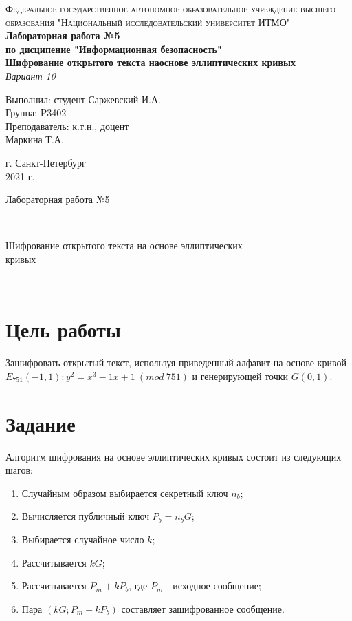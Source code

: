 \documentclass[12pt, a4paper]{article}
\begin{document}
\begin{titlepage}
\begin{center}

\textsc{Федеральное государственное автономное образовательное учреждение высшего\\
образования "Национальный исследовательский университет ИТМО"}
\vfill
\textbf{Лабораторная работа №5\\[4mm]
по дисципение "Информационная безопасность"\\[4mm]
Шифрование открытого текста наоснове эллиптических кривых\\[4mm]
}
\textit{Вариант 10\\[20mm]}
\begin{flushright}
Выполнил: студент Саржевский И.А.
\\[2mm]Группа: P3402\\[4mm]
Преподаватель: к.т.н., доцент\\
Маркина Т.А.
\end{flushright}
\vfill
г. Санкт-Петербург\\[2mm]
2021 г.

\end{center}
\end{titlepage}

\begin{huge}Лабораторная работа №5\end{huge}\\[4mm]
\begin{Large}Шифрование открытого текста на основе эллиптических\\кривых\end{Large}\\

\section*{Цель работы}

Зашифровать открытый текст, используя приведенный алфавит на основе кривой
$E_{751}(-1,1): y^2=x^3-1x+1\:(mod\:751)$ и генерирующей точки $G (0,1)$.

\section*{Задание}

Алгоритм шифрования на основе эллиптических кривых состоит из следующих шагов:

\begin{enumerate}
  \item Случайным образом выбирается секретный ключ $n_b$;
  \item Вычисляется публичный ключ $P_b = n_bG$;
  \item Выбирается случайное число $k$;
  \item Рассчитывается $kG$;
  \item Рассчитывается $P_m + kP_b$, где $P_m$ - исходное сообщение;
  \item Пара $(kG; P_m + kP_b)$ составляет зашифрованное сообщение.
\end{enumerate}
\end{document}

